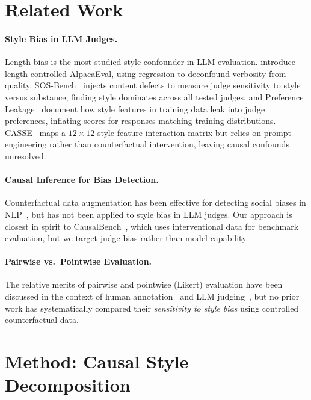 \documentclass[11pt,a4paper]{article}
\begin{document}
\section{Related Work}
\label{sec:related}

\paragraph{Style Bias in LLM Judges.}
Length bias is the most studied style confounder in LLM evaluation. \citet{dubois2024length} introduce length-controlled AlpacaEval, using regression to deconfound verbosity from quality.
SOS-Bench~\cite{sosbench2025} injects content defects to measure judge sensitivity to style versus substance, finding style dominates across all tested judges.
\citet{raina2024llm} and Preference Leakage~\cite{preferenceleakage2026} document how style features in training data leak into judge preferences, inflating scores for responses matching training distributions.
CASSE~\cite{casse2026} maps a $12{\times}12$ style feature interaction matrix but relies on prompt engineering rather than counterfactual intervention, leaving causal confounds unresolved.

\paragraph{Causal Inference for Bias Detection.}
Counterfactual data augmentation has been effective for detecting social biases in NLP~\cite{lu2020gender}, but has not been applied to style bias in LLM judges.
Our approach is closest in spirit to CausalBench~\cite{causalbench2025}, which uses interventional data for benchmark evaluation, but we target judge bias rather than model capability.

\paragraph{Pairwise vs.\ Pointwise Evaluation.}
The relative merits of pairwise and pointwise (Likert) evaluation have been discussed in the context of human annotation~\cite{kiritchenko2017best} and LLM judging~\cite{zheng2024judging}, but no prior work has systematically compared their \emph{sensitivity to style bias} using controlled counterfactual data.

\section{Method: Causal Style Decomposition}
\label{sec:method}
\end{document}
